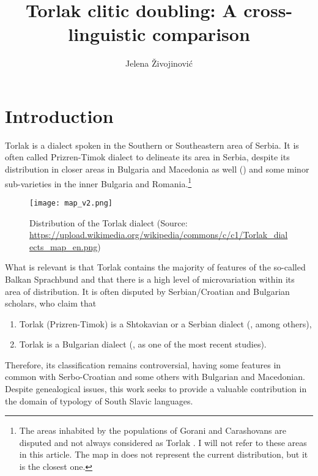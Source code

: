 \documentclass[output=paper,
colorlinks,
citecolor=brown,
newtxmath
]{langscibook}
\author{Jelena Živojinović\affiliation{University of Verona}\affiliation{UiT The Arctic University of Norway}\orcid{0000-0003-0190-0767}}
\title{Torlak clitic doubling: A cross-linguistic comparison}
\begin{document}
\maketitle
%
%

\pagebreak

\section{Introduction}\label{sec:intro}

\largerpage[1]Torlak is a dialect spoken in the Southern or Southeastern area of Serbia. It is often called Prizren-Timok dialect to delineate its area in Serbia, despite its distribution in closer areas in Bulgaria and Macedonia as well () and some minor sub-varieties in the inner Bulgaria and Romania.\footnote{The areas inhabited by the populations of Gorani and Carashovans are disputed and not always considered as Torlak \citep{Ivic1956, Browne1993}. I will not refer to these areas in this article. The map in  does not represent the current distribution, but it is the closest one.}

\begin{figure}[h!]
\texttt{[image: map\_v2.png]}
\centering
\caption[Distribution of the Torlak dialect]{Distribution of the Torlak dialect (Source: \url{https://upload.wikimedia.org/wikipedia/commons/c/c1/Torlak_dialects_map_en.png})}
\label{fig:map}                     \end{figure}

What is relevant is that Torlak contains the majority of features of the so-called Balkan Sprachbund and that there is a high level of microvariation within its area of distribution. It is often disputed by Serbian/Croatian and Bulgarian scholars, who claim that

\begin{enumerate}
\item Torlak (Prizren-Timok) is a Shtokavian or a Serbian dialect (\citealt{Belic1905,Ivic1956,Brozovic.Ivic1988}, among others),
\item Torlak is a Bulgarian dialect (\citealt{Stoykov2002}, as one of the most recent studies).
\end{enumerate}

Therefore, its classification remains controversial, having some features in common with Serbo-Croatian and some others with Bulgarian and Macedonian. Despite genealogical issues, this work seeks to provide a valuable contribution in the domain of typology of South Slavic languages.
\end{document}
